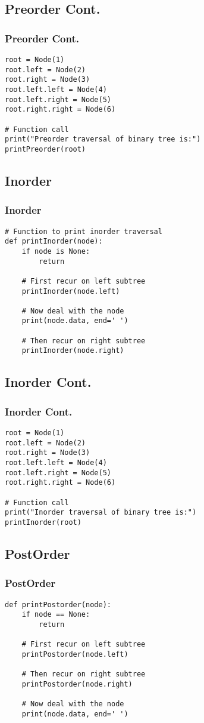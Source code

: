 \documentclass{beamer}
\begin{document}
\begin{frame}[fragile]
\subsection{Preorder Cont.}
\frametitle{Preorder Cont.}
\begin{lstlisting}
root = Node(1)
root.left = Node(2)
root.right = Node(3)
root.left.left = Node(4)
root.left.right = Node(5)
root.right.right = Node(6)

# Function call
print("Preorder traversal of binary tree is:")
printPreorder(root)
\end{lstlisting}
\end{frame}

\begin{frame}[fragile]
\subsection{Inorder}
\frametitle{Inorder}
\begin{lstlisting}
# Function to print inorder traversal
def printInorder(node):
    if node is None:
        return
 
    # First recur on left subtree
    printInorder(node.left)
 
    # Now deal with the node
    print(node.data, end=' ')
 
    # Then recur on right subtree
    printInorder(node.right)
\end{lstlisting}
\end{frame}

\begin{frame}[fragile]
\subsection{Inorder Cont.}
\frametitle{Inorder Cont.}
\begin{lstlisting}
root = Node(1)
root.left = Node(2)
root.right = Node(3)
root.left.left = Node(4)
root.left.right = Node(5)
root.right.right = Node(6)

# Function call
print("Inorder traversal of binary tree is:")
printInorder(root)
\end{lstlisting}
\end{frame}

\begin{frame}[fragile]
\subsection{PostOrder}
\frametitle{PostOrder}
\begin{lstlisting}
def printPostorder(node):
    if node == None:
        return
 
    # First recur on left subtree
    printPostorder(node.left)
 
    # Then recur on right subtree
    printPostorder(node.right)
 
    # Now deal with the node
    print(node.data, end=' ')\end{lstlisting}
\end{frame}
\end{document}

